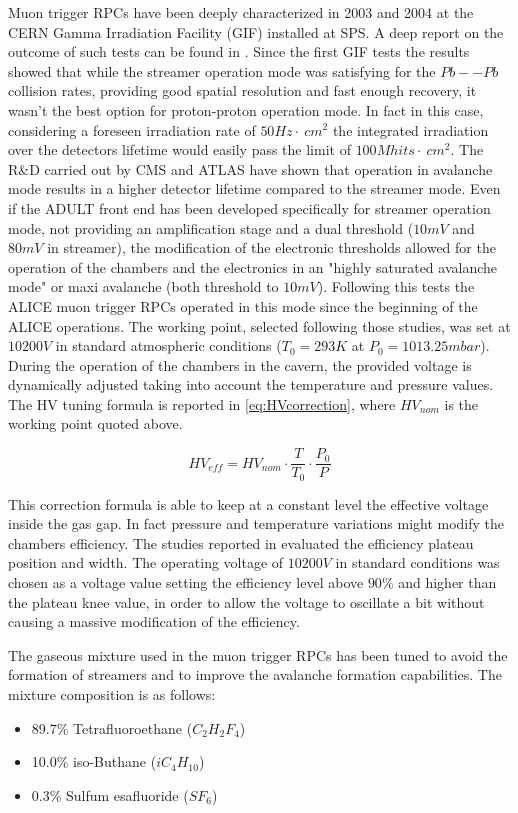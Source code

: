 Muon trigger RPCs have been deeply characterized in 2003 and 2004 at the CERN Gamma Irradiation Facility (GIF) installed at SPS.
A deep report on the outcome of such tests can be found in \cite{arnaldi:2004}.
Since the first GIF tests the results showed that while the streamer operation mode was satisfying for the $Pb--Pb$ collision rates, providing good spatial resolution and fast enough recovery, it wasn't the best option for proton-proton operation mode.
In fact in this case, considering a foreseen irradiation rate of $50 Hz\cdot~cm^2$ the integrated irradiation over the detectors lifetime would easily pass the limit of $100 Mhits\cdot~cm^2$.
The R\&D carried out by CMS and ATLAS have shown that operation in avalanche mode results in a higher detector lifetime compared to the streamer mode.
Even if the ADULT front end has been developed specifically for streamer operation mode, not providing an amplification stage and a dual threshold ($10mV$ and $80mV$ in streamer), the modification of the electronic thresholds allowed for the operation of the chambers and the electronics in an "highly saturated avalanche mode" or maxi avalanche (both threshold to $10mV$).
Following this tests the ALICE muon trigger RPCs operated in this mode since the beginning of the ALICE operations.
The working point, selected following those studies, was set at $10200V$ in standard atmospheric conditions ($T_0=293K$ at $P_0=1013.25mbar$).
During the operation of the chambers in the cavern, the provided voltage is dynamically adjusted taking into account the temperature and pressure values.
The HV tuning formula is reported in \ref{eq:HVcorrection}, where $HV_{nom}$ is the working point quoted above.

\begin{equation}
\label{eq:HVcorrection}
HV_{eff} = HV_{nom}\cdot \frac{T}{T_0} \cdot \frac{P_0}{P}
\end{equation}

This correction formula is able to keep at a constant level the effective voltage inside the gas gap.
In fact pressure and temperature variations might modify the chambers efficiency.
The studies reported in \cite{arnaldi:2004} evaluated the efficiency plateau position and width.
The operating voltage of $10200V$ in standard conditions was chosen as a voltage value setting the efficiency level above $90\%$ and higher than the plateau knee value, in order to allow the voltage to oscillate a bit without causing a massive modification of the efficiency.

The gaseous mixture used in the muon trigger RPCs has been tuned to avoid the formation of streamers and to improve the avalanche formation capabilities.
The mixture composition is as follows:
\begin{itemize}
\item 89.7\% Tetrafluoroethane ($C_2H_2F_4$)
\item 10.0\% iso-Buthane ($iC_4H_{10}$)
\item 0.3\% Sulfum esafluoride ($SF_6$)
\end{itemize}

